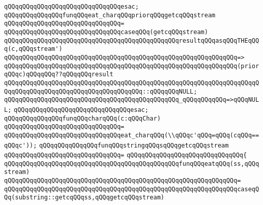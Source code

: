 \verb|qQQqqQQqqQQqqQQqqQQqqQQqqQQqqQQqesac;|\newline
\newline
\newline
\newline
\verb|qQQqqQQqqQQqqQQqfunqQQqeat_charqQQqpriorqQQqgetcqQQqstream|\newline
\verb|qQQqqQQqqQQqqQQqqQQqqQQqqQQqqQQq=|\newline
\verb|qQQqqQQqqQQqqQQqqQQqqQQqqQQqqQQqcaseqQQq(getcqQQqstream)|\newline
\newline
\verb|qQQqqQQqqQQqqQQqqQQqqQQqqQQqqQQqqQQqqQQqqQQqqQQqresultqQQqasqQQqTHEqQQq(c,qQQqstream')|\newline
\verb|qQQqqQQqqQQqqQQqqQQqqQQqqQQqqQQqqQQqqQQqqQQqqQQqqQQqqQQqqQQqqQQq=>|\newline
\verb|qQQqqQQqqQQqqQQqqQQqqQQqqQQqqQQqqQQqqQQqqQQqqQQqqQQqqQQqqQQqqQQq(priorqQQqc)qQQqqQQq??qQQqqQQqresult|\newline
\verb|qQQqqQQqqQQqqQQqqQQqqQQqqQQqqQQqqQQqqQQqqQQqqQQqqQQqqQQqqQQqqQQqqQQqqQQqqQQqqQQqqQQqqQQqqQQqqQQqqQQqqQQqqQQq::qQQqqQQqNULL;|\newline
\newline
\verb|qQQqqQQqqQQqqQQqqQQqqQQqqQQqqQQqqQQqqQQqqQQqqQQq_qQQqqQQqqQQq=>qQQqNULL;|\newline
\verb|qQQqqQQqqQQqqQQqqQQqqQQqqQQqqQQqesac;|\newline
\newline
\newline
\verb|qQQqqQQqqQQqqQQqfunqQQqcharqQQq(c:qQQqChar)|\newline
\verb|qQQqqQQqqQQqqQQqqQQqqQQqqQQqqQQq=|\newline
\verb|qQQqqQQqqQQqqQQqqQQqqQQqqQQqqQQqeat_charqQQq(\\qQQqc'qQQq=qQQq(cqQQq==qQQqc'));|\newline
\newline
\newline
\verb|qQQqqQQqqQQqqQQqfunqQQqstringqQQqsqQQqgetcqQQqstream|\newline
\verb|qQQqqQQqqQQqqQQqqQQqqQQqqQQqqQQq=|\newline
\verb|qQQqqQQqqQQqqQQqqQQqqQQqqQQqqQQq{|\newline
\verb|qQQqqQQqqQQqqQQqqQQqqQQqqQQqqQQqqQQqqQQqqQQqqQQqfunqQQqeatqQQq(ss,qQQqstream)|\newline
\verb|qQQqqQQqqQQqqQQqqQQqqQQqqQQqqQQqqQQqqQQqqQQqqQQqqQQqqQQqqQQqqQQq=|\newline
\verb|qQQqqQQqqQQqqQQqqQQqqQQqqQQqqQQqqQQqqQQqqQQqqQQqqQQqqQQqqQQqqQQqcaseqQQq(substring::getcqQQqss,qQQqgetcqQQqstream)|\newline
